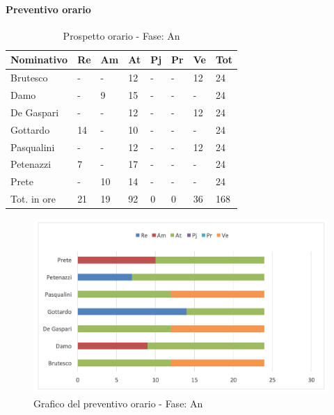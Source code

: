 			\paragraph{Preventivo orario}
							\begin{table}[H] \begin{center} \begin{tabular}{llllllll}
							\toprule
							\textbf{Nominativo}	&	\textbf{Re}	&	\textbf{Am}	&	\textbf{At}	&	\textbf{Pj}	&	\textbf{Pr}	&	\textbf{Ve}	&	\textbf{Tot}\\
							\midrule
							Brutesco	&	-	&	-	&	12	&	-	&	-	&	12	&	24	 \\
							Damo		&	-	&	9	&	15	&	-	&	-	&	-	&	24	 \\
							De Gaspari	&	-	&	-	&	12	&	-	&	-	&	12	&	24	 \\
							Gottardo	&	14	&	-	&	10	&	-	&	-	&	-	&	24	 \\
							Pasqualini	&	-	&	-	&	12	&	-	&	-	&	12	&	24	 \\
							Petenazzi	&	7	&	-	&	17	&	-	&	-	&	-	&	24	 \\
							Prete		&	-	&	10	&	14	&	-	&	-	&	-	&	24	 \\
							\midrule
							Tot. in ore	&	21	&	19	&	92	&	0	&	0	&	36	&	168	 \\

							\bottomrule
							\end{tabular} \end{center} \caption{Prospetto orario - Fase:
							An
							}\label{tab:h_An} \end{table}

								\begin{figure}[H]  \centering  \includegraphics[scale=0.45]{img/h_An}
									\caption{Grafico del preventivo orario - Fase: An}  \label{fig:h_An"} 		\end{figure}


